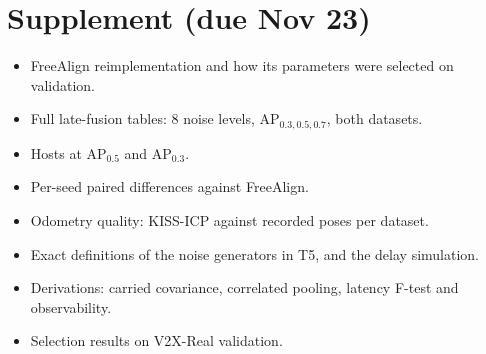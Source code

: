 \section*{Supplement (due Nov 23)}

\begin{itemize}\setlength\itemsep{1pt}
  \item[\textbf{S1}] FreeAlign reimplementation and how its parameters were selected on validation.
  \item[\textbf{S2}] Full late-fusion tables: 8 noise levels, AP$_{0.3,0.5,0.7}$, both datasets.
  \item[\textbf{S3}] Hosts at AP$_{0.5}$ and AP$_{0.3}$.
  \item[\textbf{S4}] Per-seed paired differences against FreeAlign.
  \item[\textbf{S5}] Odometry quality: KISS-ICP against recorded poses per dataset.
  \item[\textbf{S6}] Exact definitions of the noise generators in T5, and the delay simulation.
  \item[\textbf{S7}] Derivations: carried covariance, correlated pooling, latency F-test and observability.
  \item[\textbf{S8}] Selection results on V2X-Real validation.
\end{itemize}

